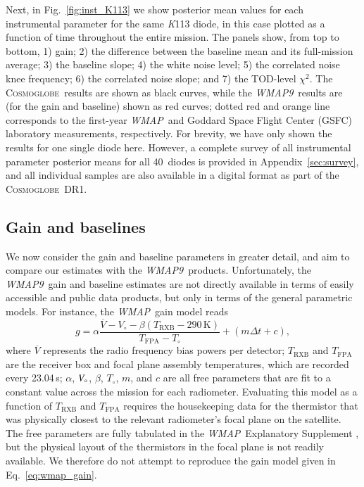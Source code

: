 \documentclass[twocolumn]{../../common/aa}
\def\WMAP{\emph{WMAP}}
\def\WMAPnine{\emph{WMAP9}}
\newcommand{\cosmoglobe}{\textsc{Cosmoglobe}}
\newcommand{\K}[0]{\textit K}
\newcommand{\V}[0]{\textit V}
\begin{document}
Next, in Fig.~\ref{fig:inst_K113} we show posterior mean values for each instrumental parameter for the same \K113 diode, in this case plotted as a function of time throughout the entire mission. The panels show, from top to bottom, 1) gain; 2) the difference between the baseline mean and its full-mission average; 3) the baseline slope; 4) the white noise level; 5) the correlated noise knee frequency; 6) the correlated noise slope; and 7) the TOD-level $\chi^2$. The \cosmoglobe\ results are shown as black curves, while the \WMAPnine\ results are (for the gain and baseline) shown as red curves; dotted red and orange line corresponds to the first-year \WMAP\ and Goddard Space Flight Center (GSFC) laboratory measurements, respectively. For brevity, we have only shown the results for one single diode here. However, a complete survey of all instrumental parameter posterior means for all 40~diodes is provided in Appendix~\ref{sec:survey}, and all individual samples are also available in a digital format as part of the \cosmoglobe\ DR1. 


\subsection{Gain and baselines}
\label{sec:gain}

We now consider the gain and baseline parameters in greater detail, and aim to compare our estimates with the \WMAPnine\ products. Unfortunately, the \WMAPnine\ gain and baseline estimates are not directly available in terms of easily accessible and public data products, but only in terms of the general parametric models. For instance, the \WMAP\ gain model reads \citep{wmapexsupp}
\begin{equation}
	\label{eq:wmap_gain}
	g=\alpha\frac{\overline V-V_\circ-\beta(T_\mathrm{RXB}-290\,\mathrm K)}
	{T_\mathrm{FPA}-T_\circ}+(m\Delta t+c),
\end{equation}
where $\overline V$ represents the radio frequency bias powers per detector; $T_\mathrm{RXB}$ and $T_\mathrm{FPA}$ are the receiver box and focal plane assembly temperatures, which are recorded every 23.04\,s; $\alpha$, $\V_\circ$, $\beta$, $T_\circ$, $m$, and $c$ are all free parameters that are fit to a constant value across the mission for each radiometer. Evaluating this model as a function of $T_\mathrm{RXB}$ and $T_\mathrm{FPA}$ requires the housekeeping data for the thermistor that was physically closest to the relevant radiometer's focal plane on the satellite. The free parameters are fully tabulated in the \WMAP\ Explanatory Supplement \citep{wmapexsupp}, but the physical layout of the thermistors in the focal plane is not readily available. We therefore do not attempt to reproduce the gain model given in Eq.~\eqref{eq:wmap_gain}.
\end{document}
